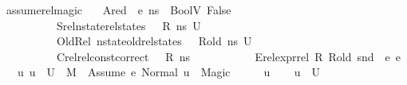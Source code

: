 \begin{isabellebody}
%
\endisatagproof
{\isafoldproof}%
%
\isadelimproof
\isanewline
%
\endisadelimproof
\isanewline
{}\isamarkupfalse%
\ assume{\isacharunderscore}{\kern0pt}rel{\isacharunderscore}{\kern0pt}magic{\isacharcolon}{\kern0pt}\isanewline
\ \ \ Ared{\isacharcolon}{\kern0pt}{\isachardoublequoteopen}{\isasymLambda}{\isacharcomma}{\kern0pt}{\isasymGamma}{\isacharcomma}{\kern0pt}{\isasymOmega}\ {\isasymturnstile}\ {\isasymlangle}e{}{\isacharcomma}{\kern0pt}\ ns{\isasymrangle}\ {\isasymDown}\ {\isacharparenleft}{\kern0pt}BoolV\ False{\isacharparenright}{\kern0pt}{\isachardoublequoteclose}\ \isanewline
\ \ \ \ \ \ \ \ \ \ Srel{\isacharcolon}{\kern0pt}{\isachardoublequoteopen}nstate{\isacharunderscore}{\kern0pt}rel{\isacharunderscore}{\kern0pt}states\ {\isasymLambda}\ {\isasymLambda}{\isacharprime}{\kern0pt}\ R\ ns\ U{\isachardoublequoteclose}\ \isanewline
\ \ \ \ \ \ \ \ \ \ OldRel{\isacharcolon}{\kern0pt}\ {\isachardoublequoteopen}nstate{\isacharunderscore}{\kern0pt}old{\isacharunderscore}{\kern0pt}rel{\isacharunderscore}{\kern0pt}states\ {\isasymLambda}\ {\isasymLambda}{\isacharprime}{\kern0pt}\ R{\isacharunderscore}{\kern0pt}old\ ns\ U{\isachardoublequoteclose}\ \isanewline
\ \ \ \ \ \ \ \ \ \ Crel{\isacharcolon}{\kern0pt}{\isachardoublequoteopen}rel{\isacharunderscore}{\kern0pt}const{\isacharunderscore}{\kern0pt}correct\ {\isasymLambda}\ {\isasymOmega}\ R\ ns{\isachardoublequoteclose}\ \isanewline
\ \ \ \ \ \ \ \ \ \ Erel{\isacharcolon}{\kern0pt}{\isachardoublequoteopen}expr{\isacharunderscore}{\kern0pt}rel\ R\ R{\isacharunderscore}{\kern0pt}old\ {\isacharparenleft}{\kern0pt}snd\ {\isasymLambda}{\isacharparenright}{\kern0pt}\ e{}\ e{}{\isachardoublequoteclose}\isanewline
\ \ \ {\isachardoublequoteopen}{\isasymAnd}u{\isachardot}{\kern0pt}\ u\ {\isasymin}\ U\ {\isasymLongrightarrow}\ M{\isacharcomma}{\kern0pt}{\isasymLambda}{\isacharprime}{\kern0pt}{\isacharcomma}{\kern0pt}{\isasymGamma}{\isacharcomma}{\kern0pt}{\isasymOmega}\ {\isasymturnstile}\ {\isasymlangle}Assume\ e{}{\isacharcomma}{\kern0pt}\ Normal\ u{\isasymrangle}\ {\isasymrightarrow}\ Magic{\isachardoublequoteclose}\isanewline
%
\isadelimproof
%
\endisadelimproof
%
\isatagproof
{}\isamarkupfalse%
\ {\isacharminus}{\kern0pt}\isanewline
\ \ \isamarkupfalse%
\ u\isanewline
\ \ \isamarkupfalse%
\ {\isachardoublequoteopen}u\ {\isasymin}\ U{\isachardoublequoteclose}\isanewline

\end{isabellebody}
